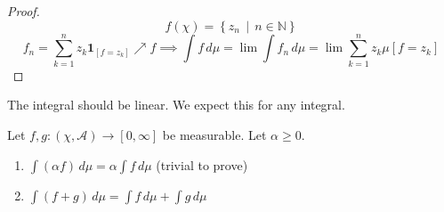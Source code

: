 \documentclass[a4paper]{article}
\numberwithin{lecref}{section}
\theoremstyle{break}
\newcommand{\SetDef}[2]{\left\{#1\,\mid\,#2\right\}}
\begin{document}
\begin{proof}
  \[ f(\chi) = \SetDef{z_n}{n \in \mathbb N} \]
  \[ f_n = \sum_{k=1}^n z_k \mathbf{1}_{[f = z_k]} \nearrow f \implies \int f \, d\mu = \lim \int f_n \, d\mu = \lim \sum_{k=1}^n z_k \mu[f = z_k] \]
\end{proof}

The integral should be linear. We expect this for any integral.

\begin{theorem}
  Let $f, g: (\chi, \mathcal A) \to [0, \infty]$ be measurable. Let $\alpha \geq 0$.
  \begin{enumerate}
    \item $\int (\alpha f) \, d\mu = \alpha \int f \, d\mu$ (trivial to prove)
    \item $\int (f + g) \, d\mu = \int f \, d\mu + \int g \, d\mu$
  \end{enumerate}
\end{theorem}
\end{document}
